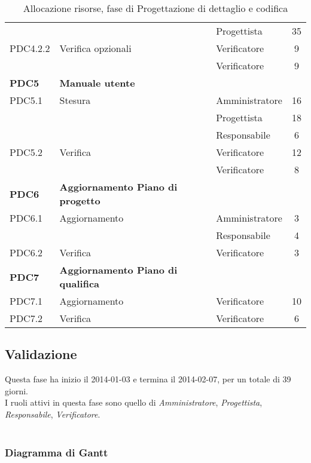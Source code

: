 \begin{table}[H]
\begin{adjustwidth}{-4cm}{-4cm}
\begin{tabular}{ l l l c  }
    & & Progettista & 35\\
	\cline{3-4}
	PDC4.2.2 & Verifica opzionali & Verificatore & 9\\	
	& & Verificatore & 9\\
	\hline
	\textbf{PDC5} & \textbf{Manuale utente} \\
	\cline{3-4}
	PDC5.1 & Stesura  & Amministratore & 16\\ 
	 & & Progettista & 18\\
	 & & Responsabile & 6\\
    \cline{3-4}
	PDC5.2 & Verifica & Verificatore &  12\\
	& & Verificatore & 8\\
	\hline
	\textbf{PDC6} & \textbf{Aggiornamento Piano di progetto} \\
	\cline{3-4}
	PDC6.1 & Aggiornamento  & Amministratore & 3\\ 
	 & & Responsabile & 4\\
    \cline{3-4}
	PDC6.2 & Verifica & Verificatore &  3\\
	\hline
	\textbf{PDC7} & \textbf{Aggiornamento Piano di qualifica} \\
	\cline{3-4}
	PDC7.1 & Aggiornamento  & Verificatore & 10\\ 
    \cline{3-4}
	PDC7.2 & Verifica & Verificatore &  6\\
	\hline
	\end{tabular}
	\caption{Allocazione risorse, fase di Progettazione di dettaglio e codifica}
\end{adjustwidth}
\end{table}	
	
	
	\subsection{Validazione}
	
Questa fase ha inizio il 2014-01-03 e termina il 2014-02-07, per un totale di 39 giorni. \\
I ruoli attivi in questa fase sono quello di \textit{Amministratore}, \textit{Progettista}, \textit{Responsabile}, \textit{Verificatore}. \\ \\

\subsubsection{Diagramma di Gantt}

